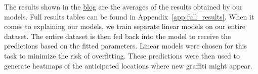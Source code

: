 The results shown in the \href{https://cowkeyman.github.io/PredictingGraffitiUsingCityLayouts/results.html}{blog} are the averages of the results obtained by our models. Full results tables can be found in Appendix~\ref{app:full_results}. When it comes to explaining our models, we train separate linear models on our entire dataset. The entire dataset is then fed back into the model to receive the predictions based on the fitted parameters. Linear models were chosen for this task to minimize the risk of overfitting. These predictions were then used to generate heatmaps of the anticipated locations where new graffiti might appear.

